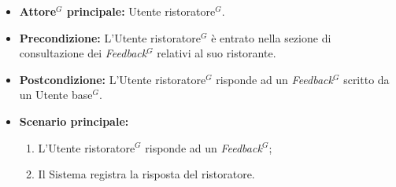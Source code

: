 \label{usecase:Risposta ad un \gls{Feedback}$^G$}
\begin{itemize}
	\item \textbf{\gls{Attore}$^G$ principale:} \gls{Utente ristoratore}$^G$.

	\item \textbf{Precondizione:} L'\gls{Utente ristoratore}$^G$ è entrato nella sezione di consultazione dei \textit{\gls{Feedback}$^G$} relativi al suo ristorante.

	\item \textbf{Postcondizione:} L'\gls{Utente ristoratore}$^G$ risponde ad un \textit{\gls{Feedback}$^G$} scritto da un \gls{Utente base}$^G$.


	\item \textbf{Scenario principale:}
	      \begin{enumerate}
		      \item L'\gls{Utente ristoratore}$^G$ risponde ad un \textit{\gls{Feedback}$^G$};
		      \item Il Sistema registra la risposta del ristoratore.

	      \end{enumerate}
\end{itemize}
